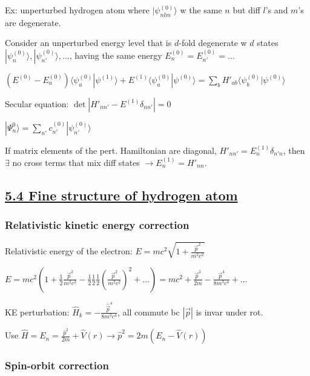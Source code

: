 Ex: unperturbed hydrogen atom where $|\psi^{(0)}_{nlm}\rangle$ w the same $n$ but diff $l$'s and $m$'s are degenerate.

Consider an unperturbed energy level that is $d$-fold degenerate w $d$ states $|\psi_n^{(0)}\rangle, |\psi_{n'}^{(0)}\rangle, \dots$, having the same energy $E_n^{(0)} = E_{n'}^{(0)} = \dots$


$(E^{(0)} - E^{(0)}_a) \langle \psi^{(0)}_a | \psi^{(1)} \rangle + E^{(1)} \langle \psi_a^{(0)} | \psi^{(0)} \rangle = \sum_b H'_{ab} \langle \psi_b^{(0)} | \psi^{(0)} \rangle$

Secular equation: $\det |H'_{nn'} - E^{(1)} \delta_{n n'}| = 0$

$|\Psi_n^0 \rangle = \sum_{n'} c_{n'}^{(0)} | \psi_{n'}^{(0)} \rangle$

If matrix elements of the pert. Hamiltonian are diagonal, $H'_{nn'} = E_n^{(1)} \delta_{n'n}$, then $\exists$ no cross terms that mix diff states $\rightarrow E_n^{(1)} = H'_{nn}$.

\subsection{\underline{5.4 Fine structure of hydrogen atom}}

\subsubsection{Relativistic kinetic energy correction}

Relativistic energy of the electron: $E = mc^2 \sqrt{1 + \frac{\vec{p}^2}{m^2 c^2}}$

$E = mc^2(1 + \frac{1}{2} \frac{\vec{p}^2}{m^2 c^2} - \frac{1}{2}\frac{1}{2}\frac{1}{2} (\frac{\vec{p}^2}{m^2 c^2})^2 + \dots) = mc^2 + \frac{\vec{p}^2}{2m} - \frac{\vec{p}^4}{8m^3c^4} + \dots$

KE perturbation: $\widehat{H}_k = -\frac{\widehat{\vec{p}}^4}{8 m^3 c^4}$, all commute bc $|\vec{p}|$ is invar under rot.

Use $\widehat{H} = E_n = \frac{\widehat{p}^2}{2m} + \widehat{V}(r) \rightarrow \widehat{p}^2 = 2m(E_n - \widehat{V}(r))$

\subsubsection{Spin-orbit correction}

